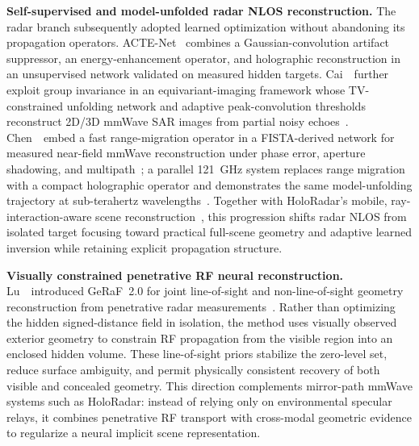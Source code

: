 \vspace{0.8mm}
\noindent \textbf{Self-supervised and model-unfolded radar NLOS reconstruction.}
The radar branch subsequently adopted learned optimization without abandoning its propagation operators. ACTE-Net~\cite{caiACTENetRadarNLOS2025} combines a Gaussian-convolution artifact suppressor, an energy-enhancement operator, and holographic reconstruction in an unsupervised network validated on measured hidden targets. Cai~\etal~further exploit group invariance in an equivariant-imaging framework whose TV-constrained unfolding network and adaptive peak-convolution thresholds reconstruct 2D/3D mmWave SAR images from partial noisy echoes~\cite{caiEquivariantRadarNLOS2025}. Chen~\etal~embed a fast range-migration operator in a FISTA-derived network for measured near-field mmWave reconstruction under phase error, aperture shadowing, and multipath~\cite{chenRMOperatorMmWaveNLOS2026}; a parallel 121~GHz system replaces range migration with a compact holographic operator and demonstrates the same model-unfolding trajectory at sub-terahertz wavelengths~\cite{chenDeepUnfoldingTHzNLOS2026}. Together with HoloRadar's mobile, ray-interaction-aware scene reconstruction~\cite{laiHoloRadar2025}, this progression shifts radar NLOS from isolated target focusing toward practical full-scene geometry and adaptive learned inversion while retaining explicit propagation structure.

\vspace{0.8mm}
\noindent \textbf{Visually constrained penetrative RF neural reconstruction.}
Lu~\etal~introduced GeRaF~2.0 for joint line-of-sight and non-line-of-sight geometry reconstruction from penetrative radar measurements~\cite{luSeeingThroughBoxes2026}. Rather than optimizing the hidden signed-distance field in isolation, the method uses visually observed exterior geometry to constrain RF propagation from the visible region into an enclosed hidden volume. These line-of-sight priors stabilize the zero-level set, reduce surface ambiguity, and permit physically consistent recovery of both visible and concealed geometry. This direction complements mirror-path mmWave systems such as HoloRadar: instead of relying only on environmental specular relays, it combines penetrative RF transport with cross-modal geometric evidence to regularize a neural implicit scene representation.

